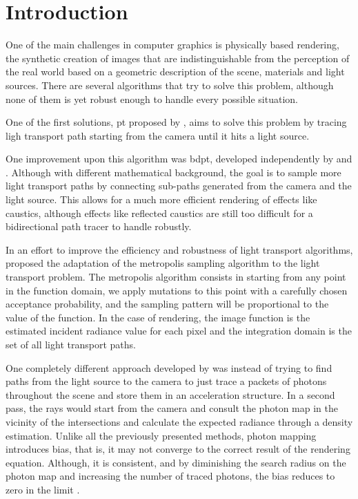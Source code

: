 \chapter{Introduction}

One of the main challenges in computer graphics is physically based rendering, the synthetic creation of images that are indistinguishable from the perception of the real world based on a geometric description of the scene, materials and light sources. There are several algorithms that try to solve this problem, although none of them is yet robust enough to handle every possible situation.

One of the first solutions, \gls{pt} proposed by \cite{Kajiya}, aims to solve this problem by tracing ligh transport path starting from the camera until it hits a light source.

One improvement upon this algorithm was \gls{bdpt}, developed independently by \cite{Lafortune} and \cite{Veach}. Although with different mathematical background, the goal is to sample more light transport paths by connecting sub-paths generated from the camera and the light source. This allows for a much more efficient rendering of effects like caustics, although
effects like reflected caustics are still too difficult for a bidirectional path tracer to handle robustly.

In an effort to improve the efficiency and robustness of light transport algorithms, \cite{Veach} proposed the adaptation of the metropolis sampling algorithm to the light transport problem. The metropolis algorithm consists in starting from any point in the function domain, we apply mutations to this point with a carefully chosen acceptance probability, and the sampling pattern will be proportional to the value of the function. In the case of rendering, the image function is the estimated incident radiance value for each pixel and the integration domain is the set of all light transport paths.

One completely different approach developed by \cite{Jensen} was instead of trying to find paths from the light source to the camera to just trace a packets of photons throughout the scene and store them in an acceleration structure. In a second pass, the rays would start from the camera and consult the photon map in the vicinity of the intersections and calculate the expected radiance through a density estimation. Unlike all the previously presented methods, photon mapping introduces bias, that is, it may not converge to the correct result of the rendering equation. Although, it is consistent, and by diminishing the search radius on the photon map and increasing the number of traced photons, the bias reduces to zero in the limit \citep{Hachisuka}.

